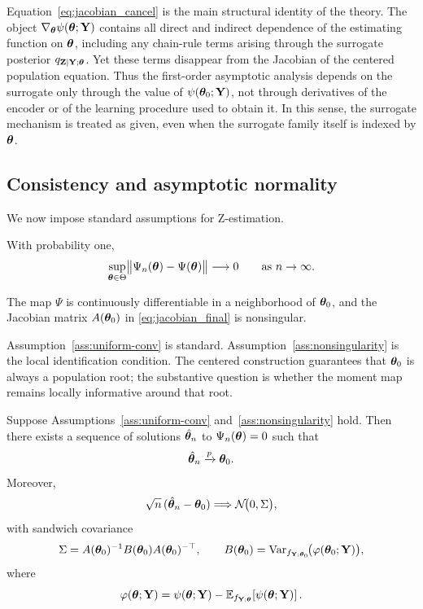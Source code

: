 \documentclass[twoside,11pt]{article}
\newcommand{\Var}{\operatorname{Var}}
\begin{document}
Equation~\eqref{eq:jacobian_cancel} is the main structural identity of the
theory. The object $\nabla_{\bm{\theta}} \psi({\bm{\theta}};{\bf Y})$ contains all direct and indirect
dependence of the estimating function on ${\bm{\theta}}$, including any chain-rule terms
arising through the surrogate posterior $q_{{\bf Z}\mid{\bf Y};{\bm{\theta}}}$. Yet these terms
disappear from the Jacobian of the centered population equation. Thus the first-order asymptotic analysis depends on the surrogate only through
the value of $\psi({\bm{\theta}}_0;{\bf Y})$, not through derivatives of the encoder or of the
learning procedure used to obtain it. In this sense, the surrogate mechanism is
treated as given, even when the surrogate family itself is indexed by ${\bm{\theta}}$.

\subsection{Consistency and asymptotic normality}

We now impose standard assumptions for Z-estimation.

\begin{assumption}
\label{ass:uniform-conv}
With probability one,
\[
\sup_{{\bm{\theta}}\in\Theta}
\bigl\|
\Psi_n({\bm{\theta}})-\Psi({\bm{\theta}})
\bigr\|
\longrightarrow 0
\qquad\text{as } n\to\infty.
\]
\end{assumption}

\begin{assumption}
\label{ass:nonsingularity}
The map $\Psi$ is continuously differentiable in a neighborhood of ${\bm{\theta}}_0$, and
the Jacobian matrix $A({\bm{\theta}}_0)$ in \eqref{eq:jacobian_final} is nonsingular.
\end{assumption}

Assumption~\ref{ass:uniform-conv} is standard. Assumption~\ref{ass:nonsingularity}
is the local identification condition. The centered construction guarantees that
${\bm{\theta}}_0$ is always a population root; the substantive question is whether the
moment map remains locally informative around that root.

\begin{theorem}
\label{thm:Zq-main}
Suppose Assumptions~\ref{ass:uniform-conv} and~\ref{ass:nonsingularity} hold.
Then there exists a sequence of solutions $\hat{{\bm{\theta}}}_n$ to $\Psi_n({\bm{\theta}})=0$ such that
\[
\hat{{\bm{\theta}}}_n \xrightarrow{p} {\bm{\theta}}_0.
\]
Moreover,
\[
\sqrt{n}\,(\hat{{\bm{\theta}}}_n-{\bm{\theta}}_0)
\Longrightarrow
\mathcal N\!\bigl(0,\Sigma\bigr),
\]
with sandwich covariance
\[
\Sigma
=
A(\bt_0)^{-1}
B(\bt_0)
A(\bt_0)^{-\top},
\qquad
B(\bt_0)
=
\Var_{f_{\Y;\bt_0}}\!\bigl(\varphi(\bt_0;\Y)\bigr),
\]
where
\[
\varphi({\bm{\theta}};{\bf Y})
=
\psi({\bm{\theta}};{\bf Y})-\mathbb E_{f_{{\bf Y};{\bm{\theta}}}}\!\left[\psi({\bm{\theta}};{\bf Y})\right].
\]
\end{theorem}
\end{document}
